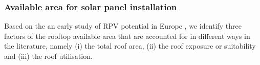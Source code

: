 \subsubsection{Available area for solar panel installation}


Based on the an early study of RPV potential in Europe \cite{iea_potential_2002}, we identify three factors of the rooftop available area that are accounted for in different ways in the literature, namely (i) the total roof area, (ii) the roof exposure or suitability and (iii) the roof utilisation. 

